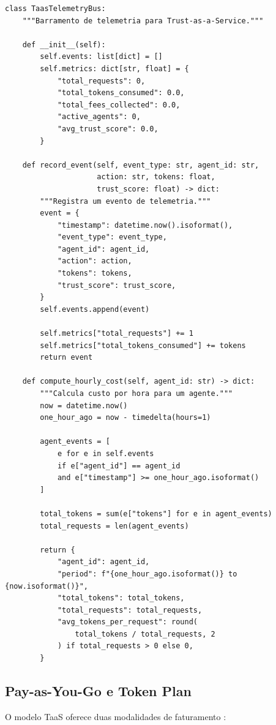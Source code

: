 \begin{lstlisting}[caption={Barramento de telemetria TaaS},
                  label={lst:taas-telemetry}]
class TaasTelemetryBus:
    """Barramento de telemetria para Trust-as-a-Service."""

    def __init__(self):
        self.events: list[dict] = []
        self.metrics: dict[str, float] = {
            "total_requests": 0,
            "total_tokens_consumed": 0.0,
            "total_fees_collected": 0.0,
            "active_agents": 0,
            "avg_trust_score": 0.0,
        }

    def record_event(self, event_type: str, agent_id: str,
                     action: str, tokens: float,
                     trust_score: float) -> dict:
        """Registra um evento de telemetria."""
        event = {
            "timestamp": datetime.now().isoformat(),
            "event_type": event_type,
            "agent_id": agent_id,
            "action": action,
            "tokens": tokens,
            "trust_score": trust_score,
        }
        self.events.append(event)

        self.metrics["total_requests"] += 1
        self.metrics["total_tokens_consumed"] += tokens
        return event

    def compute_hourly_cost(self, agent_id: str) -> dict:
        """Calcula custo por hora para um agente."""
        now = datetime.now()
        one_hour_ago = now - timedelta(hours=1)

        agent_events = [
            e for e in self.events
            if e["agent_id"] == agent_id
            and e["timestamp"] >= one_hour_ago.isoformat()
        ]

        total_tokens = sum(e["tokens"] for e in agent_events)
        total_requests = len(agent_events)

        return {
            "agent_id": agent_id,
            "period": f"{one_hour_ago.isoformat()} to {now.isoformat()}",
            "total_tokens": total_tokens,
            "total_requests": total_requests,
            "avg_tokens_per_request": round(
                total_tokens / total_requests, 2
            ) if total_requests > 0 else 0,
        }
\end{lstlisting}

\subsection{Pay-as-You-Go e Token Plan}

O modelo TaaS oferece duas modalidades de faturamento
\cite{opencode2026token}:


